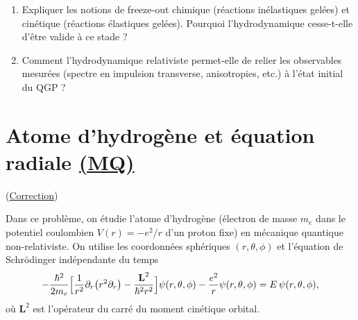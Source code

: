 \documentclass[a4paper,10pt]{report}
\begin{document}
\begin{enumerate}
	\item Expliquer les notions de freeze-out chimique (r\'eactions in\'elastiques gel\'ees) et cin\'etique (r\'eactions \'elastiques gel\'ees). Pourquoi l’hydrodynamique cesse-t-elle d’\^etre valide \`a ce stade ?
	
	\item Comment l'hydrodynamique relativiste permet-elle de relier les observables mesur\'ees (spectre en impulsion transverse, anisotropies, etc.) \`a l'\'etat initial du QGP ?
\end{enumerate}


\newpage \section[Atome d'hydrogène et équation radiale]{Atome d'hydrogène et équation radiale \hyperref[subsubsec:quantique]{(MQ)}\space\faStar\faStar\faStar}
\label{subsec:Atom}(\hyperref[subsec:correctionAtom]{Correction})

Dans ce problème, on étudie l'atome d'hydrogène (électron de masse $m_e$ dans le potentiel coulombien $V(r)=-e^2/r$ d'un proton fixe) en mécanique quantique non-relativiste. On utilise les coordonnées sphériques $(r,\theta,\phi)$ et l'équation de Schrödinger indépendante du temps 
\[
-\frac{\hbar^2}{2m_e}\Bigl[\frac{1}{r^2}\partial_r\bigl(r^2 \partial_r\bigr) - \frac{\textbf{L}^2}{\hbar^2 r^2}\Bigr]\psi(r,\theta,\phi) - \frac{e^2}{r}\psi(r,\theta,\phi) = E\,\psi(r,\theta,\phi),
\]
où $\textbf{L}^2$ est l'opérateur du carré du moment cinétique orbital. 
\end{document}
